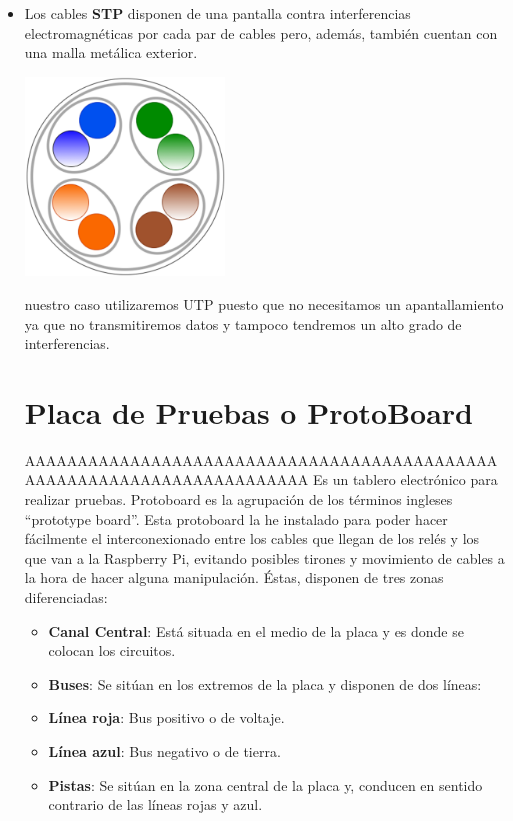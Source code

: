 \begin{itemize}
\item Los cables \textbf{STP} disponen de una pantalla contra interferencias electromagnéticas por cada par de cables pero, además, también cuentan con una malla metálica exterior.
  \begin{center}
  \includegraphics[width=200]{img/STP.pdf}
  \end{center}

\emphEn nuestro caso utilizaremos UTP puesto que no necesitamos un apantallamiento ya que no transmitiremos datos y tampoco tendremos un alto grado de interferencias.

\section{Placa de Pruebas o ProtoBoard}
AAAAAAAAAAAAAAAAAAAAAAAAAAAAAAAAAAAAAAAAAAAAAAAAAAAAAAAAAAAAAAAAAAAAAAAA
Es un tablero electrónico para realizar pruebas. Protoboard es la agrupación de los términos ingleses “prototype board”.
Esta protoboard la he instalado para poder hacer fácilmente el interconexionado entre los cables que llegan de los relés y los que van a la Raspberry Pi, evitando posibles tirones y movimiento de cables a la hora de hacer alguna manipulación.
Éstas, disponen de tres zonas diferenciadas:

\begin{itemize}
    \item \textbf{Canal Central}: Está situada en el medio de la placa y es donde se colocan los circuitos.
    \item \textbf{Buses}: Se sitúan en los extremos de la placa y disponen de dos líneas:
    \item \textbf{Línea roja}: Bus positivo o de voltaje.
    \item \textbf{Línea azul}: Bus negativo o de tierra.
    \item \textbf{Pistas}: Se sitúan en la zona central de la placa y, conducen en sentido contrario de las líneas rojas y azul.
\end{itemize}


\end{itemize}
